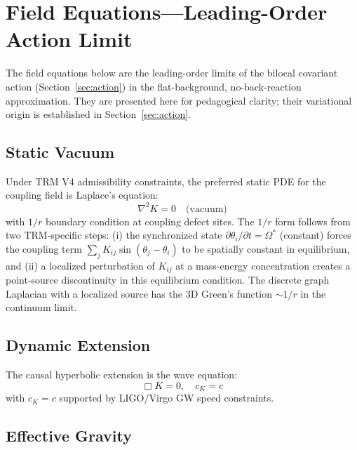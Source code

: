 \documentclass[12pt]{article}
\begin{document}
\section{Field Equations---Leading-Order Action Limit}
\label{sec:field_eqs}

The field equations below are the leading-order limits of the bilocal covariant action (Section~\ref{sec:action}) in the flat-background, no-back-reaction approximation. They are presented here for pedagogical clarity; their variational origin is established in Section~\ref{sec:action}.

\subsection{Static Vacuum}

Under TRM V4 admissibility constraints, the preferred static PDE for the coupling field is Laplace's equation:
\begin{equation}
\nabla^2 K = 0 \quad \text{(vacuum)}
\label{eq:laplace}
\end{equation}
with $1/r$ boundary condition at coupling defect sites. The $1/r$ form follows from two TRM-specific steps: (i) the synchronized state $\partial\theta_i/\partial t = \Omega^*$ (constant) forces the coupling term $\sum_j K_{ij} \sin(\theta_j-\theta_i)$ to be spatially constant in equilibrium, and (ii) a localized perturbation of $K_{ij}$ at a mass-energy concentration creates a point-source discontinuity in this equilibrium condition. The discrete graph Laplacian with a localized source has the 3D Green's function $\sim 1/r$ in the continuum limit.

\subsection{Dynamic Extension}

The causal hyperbolic extension is the wave equation:
\begin{equation}
\Box K = 0, \quad c_K = c
\label{eq:wave}
\end{equation}
with $c_K = c$ supported by LIGO/Virgo GW speed constraints.

\subsection{Effective Gravity}
\end{document}
